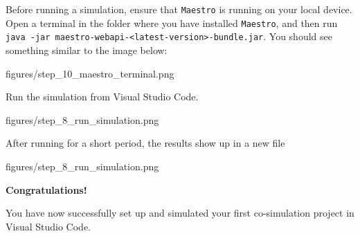 \documentclass[11pt,a4paper]{../tutorial}
\newcommand{\maestro}{\texttt{Maestro}\xspace}
\begin{document}
\begin{instructions}

\item Before running a simulation, ensure that \maestro is running on your local device. Open a terminal in the folder where you have installed \maestro, and then run \texttt{java -jar maestro-webapi-<latest-version>-bundle.jar}. You should see something similar to the image below:

\begin{annotation}[width=0.85\linewidth]{figures/step_10_maestro_terminal.png}
	\end{annotation}

\item Run the simulation from Visual Studio Code.


\begin{annotation}[width=0.85\linewidth]{figures/step_8_run_simulation.png}
	\end{annotation}

\item After running for a short period, the results show up in a new file 


	\begin{annotation}[width=0.85\linewidth]{figures/step_8_run_simulation.png}
		\end{annotation}

		\bigskip
    \bigskip
    {\large\bfseries Congratulations!}

    You have now successfully set up and simulated your first co-simulation project in Visual Studio Code.
\end{instructions}
\end{document}
